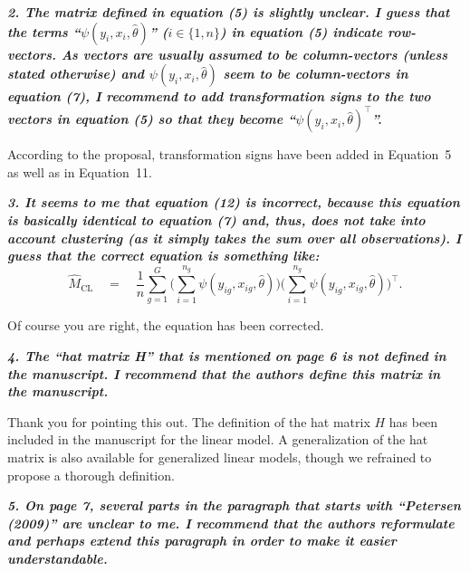 \documentclass[10pt,a4paper]{article}
\begin{document}
\medskip

\textbf{\textit{2. The matrix defined in equation (5) is slightly unclear. I guess that the terms ``$\psi(y_i, x_i, \hat\theta)$'' ($i \in \{1, n\}$) in equation (5) indicate row-vectors. As vectors are usually assumed to be column-vectors (unless stated otherwise) and $\psi(y_i, x_i, \hat\theta)$ seem to be column-vectors in
equation (7), I recommend to add transformation signs to the two vectors in equation (5)
so that they become ``$\psi(y_i, x_i, \hat\theta)^\top$''.}}

\medskip

According to the proposal, transformation signs have been added in Equation~5 as well as in Equation~11. 

\medskip

\textbf{\textit{3. It seems to me that equation (12) is incorrect, because this equation is basically identical
to equation (7) and, thus, does not take into account clustering (as it simply takes the
sum over all observations). I guess that the correct equation is something like:
\begin{equation}
  \hat M_\mathrm{CL} \quad = \quad \frac{1}{n} \sum_{g = 1}^G\bigg(\sum_{i = 1}^{n_{g}}\psi(y_{ig}, x_{ig}, \hat \theta) \bigg) \bigg(\sum_{i = 1}^{n_{g}} \psi(y_{ig}, x_{ig}, \hat \theta) \bigg)^\top.
\end{equation}}}

\medskip

Of course you are right, the equation has been corrected. 

\medskip

\textbf{\textit{4. The ``hat matrix H'' that is mentioned on page 6 is not defined in the manuscript. I
recommend that the authors define this matrix in the manuscript.}}

\medskip

Thank you for pointing this out. The definition of the hat matrix $H$ has been included in the manuscript for the linear model.
A generalization of the hat matrix is also available for generalized linear models, though we refrained to propose a thorough definition.

\medskip

\textbf{\textit{5. On page 7, several parts in the paragraph that starts with ``Petersen (2009)'' are unclear
to me. I recommend that the authors reformulate and perhaps extend this paragraph in
order to make it easier understandable.}}

\medskip
\end{document}
